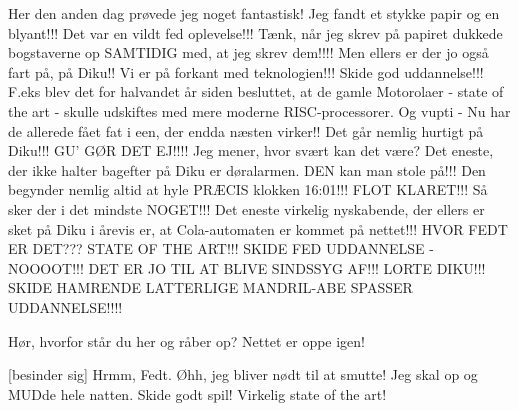 \documentclass[11pt]{article}
\begin{document}
\begin{sketch}
Her den anden dag prøvede jeg noget fantastisk! Jeg fandt et stykke papir 
og en blyant!!! Det var en vildt fed oplevelse!!! Tænk, når jeg skrev på 
papiret dukkede bogstaverne op SAMTIDIG med, at jeg skrev dem!!!! Men 
ellers er der jo også fart på, på Diku!! Vi er på forkant med teknologien!!! 
Skide god uddannelse!!! F.eks blev det for halvandet år siden besluttet, at de 
gamle Motorolaer - state of the art - skulle udskiftes med mere moderne 
RISC-processorer. Og vupti - Nu har de allerede fået fat i een, der endda 
næsten virker!! Det går nemlig hurtigt på Diku!!! GU' GØR DET EJ!!!! Jeg 
mener, hvor svært kan det være? Det eneste, der ikke halter bagefter på 
Diku er døralarmen. DEN kan man stole på!!! Den begynder nemlig altid at 
hyle PRÆCIS klokken 16:01!!! FLOT KLARET!!! Så sker der i det mindste 
NOGET!!! Det eneste virkelig nyskabende, der ellers er sket på Diku i 
årevis er, at Cola-automaten er kommet på nettet!!! HVOR FEDT ER 
DET??? STATE OF THE ART!!! SKIDE FED UDDANNELSE - 
NOOOOT!!! DET ER JO TIL AT BLIVE SINDSSYG AF!!! LORTE 
DIKU!!! SKIDE HAMRENDE LATTERLIGE MANDRIL-ABE 
SPASSER UDDANNELSE!!!!


 Hør, hvorfor står du her og råber op? Nettet er oppe 
igen!

 [besinder sig] Hrmm, Fedt. Øhh, jeg bliver nødt til at smutte! Jeg 
skal op og MUDde hele natten. Skide godt spil! Virkelig state of the art!

\end{sketch}
\end{document}
